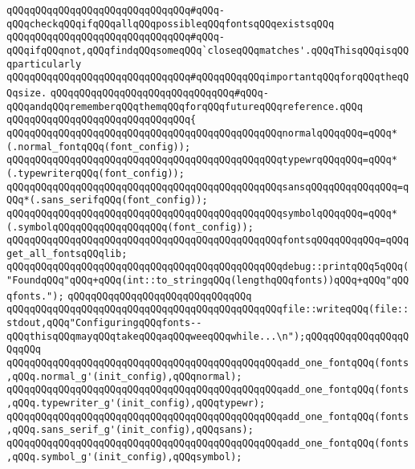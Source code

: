 \verb|qQQqqQQqqQQqqQQqqQQqqQQqqQQqqQQq#qQQq-qQQqcheckqQQqifqQQqallqQQqpossibleqQQqfontsqQQqexistsqQQq|\newline
\verb|qQQqqQQqqQQqqQQqqQQqqQQqqQQqqQQq#qQQq-qQQqifqQQqnot,qQQqfindqQQqsomeqQQq`closeqQQqmatches'.qQQqThisqQQqisqQQqparticularly|\newline
\verb|qQQqqQQqqQQqqQQqqQQqqQQqqQQqqQQq#qQQqqQQqqQQqimportantqQQqforqQQqtheqQQqsize.|\newline
\verb|qQQqqQQqqQQqqQQqqQQqqQQqqQQqqQQq#qQQq-qQQqandqQQqrememberqQQqthemqQQqforqQQqfutureqQQqreference.qQQq|\newline
\verb|qQQqqQQqqQQqqQQqqQQqqQQqqQQqqQQq{|\newline
\verb|qQQqqQQqqQQqqQQqqQQqqQQqqQQqqQQqqQQqqQQqqQQqqQQqnormalqQQqqQQq=qQQq*(.normal_fontqQQq(font_config));|\newline
\verb|qQQqqQQqqQQqqQQqqQQqqQQqqQQqqQQqqQQqqQQqqQQqqQQqtypewrqQQqqQQq=qQQq*(.typewriterqQQq(font_config));|\newline
\verb|qQQqqQQqqQQqqQQqqQQqqQQqqQQqqQQqqQQqqQQqqQQqqQQqsansqQQqqQQqqQQqqQQq=qQQq*(.sans_serifqQQq(font_config));|\newline
\verb|qQQqqQQqqQQqqQQqqQQqqQQqqQQqqQQqqQQqqQQqqQQqqQQqsymbolqQQqqQQq=qQQq*(.symbolqQQqqQQqqQQqqQQqqQQq(font_config));|\newline
\verb|qQQqqQQqqQQqqQQqqQQqqQQqqQQqqQQqqQQqqQQqqQQqqQQqfontsqQQqqQQqqQQq=qQQqget_all_fontsqQQqlib;|\newline
\verb|qQQqqQQqqQQqqQQqqQQqqQQqqQQqqQQqqQQqqQQqqQQqqQQqdebug::printqQQq5qQQq("FoundqQQq"qQQq+qQQq(int::to_stringqQQq(lengthqQQqfonts))qQQq+qQQq"qQQqfonts.");|\newline
\verb|qQQqqQQqqQQqqQQqqQQqqQQqqQQqqQQq|\newline
\verb|qQQqqQQqqQQqqQQqqQQqqQQqqQQqqQQqqQQqqQQqqQQqqQQqfile::writeqQQq(file::stdout,qQQq"ConfiguringqQQqfonts--qQQqthisqQQqmayqQQqtakeqQQqaqQQqweeqQQqwhile...\n");qQQqqQQqqQQqqQQqqQQqqQQq|\newline
\verb|qQQqqQQqqQQqqQQqqQQqqQQqqQQqqQQqqQQqqQQqqQQqqQQqadd_one_fontqQQq(fonts,qQQq.normal_g'(init_config),qQQqnormal);|\newline
\verb|qQQqqQQqqQQqqQQqqQQqqQQqqQQqqQQqqQQqqQQqqQQqqQQqadd_one_fontqQQq(fonts,qQQq.typewriter_g'(init_config),qQQqtypewr);|\newline
\verb|qQQqqQQqqQQqqQQqqQQqqQQqqQQqqQQqqQQqqQQqqQQqqQQqadd_one_fontqQQq(fonts,qQQq.sans_serif_g'(init_config),qQQqsans);|\newline
\verb|qQQqqQQqqQQqqQQqqQQqqQQqqQQqqQQqqQQqqQQqqQQqqQQqadd_one_fontqQQq(fonts,qQQq.symbol_g'(init_config),qQQqsymbol);|\newline
